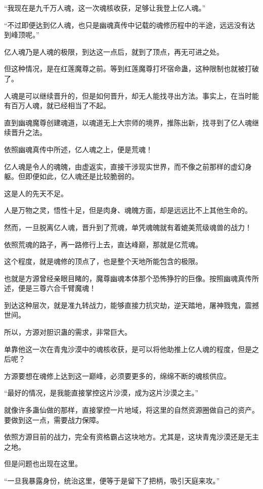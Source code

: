 \begin{this_body}
“我现在是九千万人魂，这一次魂核收获，足够让我登上亿人魂。”

“不过即便达到亿人魂，也只是幽魂真传中记载的魂修历程中的半途，远远没有达到峰顶呢。”

亿人魂乃是人魂的极限，到达这一点后，就到了顶点，再无可进之处。

但这种情况，是在红莲魔尊之前。等到红莲魔尊打坏宿命蛊，这种限制也就被打破了。

人魂是可以继续晋升的，但是如何晋升，却无人能找寻出方法。事实上，在当时能有百万人魂，就已经相当了不起。

直到幽魂魔尊创建魂道，以魂道无上大宗师的境界，推陈出新，找寻到了亿人魂继续晋升之法。

依照幽魂真传中所述，亿人魂之上，便是荒魂！

亿人魂是令人的魂魄，由虚返实，直接干涉现实世界，而不像之前那样的虚幻身躯。但即便如此，亿人魂还是比较脆弱的。

这是人的先天不足。

人是万物之灵，悟性十足，但是肉身、魂魄方面，却是远远比不上其他生命的。

然而，一旦脱离亿人魂，晋升到了荒魂，单凭魂魄就有着媲美荒级魂兽的战力！

依照荒魂的路子，再一路修行上去，直达峰巅，那就是亿荒魂。

这个程度，就是魂修的顶点了，也是整个天地所能包含的极限。

也就是方源曾经亲眼目睹的，魔尊幽魂本体那个恐怖狰狞的巨像。按照幽魂真传所述，便是三尊六合千臂魔魂！

到达这种层次，就是准九转战力，能够直接力抗灾劫，逆天踏地，屠神戮鬼，震撼世间。

所以，方源对胆识蛊的需求，非常巨大。

单靠他这一次在青鬼沙漠中的魂核收获，是可以将他助推上亿人魂的程度，但是之后呢？

方源要想在魂修上达到这一巅峰，必须要更多的，绵绵不断的魂核供应。

“最好的情况，是我能直接掌控这片沙漠，成为这片沙漠之主。”

就像许多蛊仙做的那样，直接掌控一片地域，将这里的自然资源圈做自己的资产。要做到这一点，需要战力保障。

依照方源目前的战力，完全有资格霸占这块地方。尤其是，这块青鬼沙漠还是无主之地。

但是问题也出现在这里。

“一旦我暴露身份，统治这里，便等于是留下了把柄，吸引天庭来攻。”


\end{this_body}
